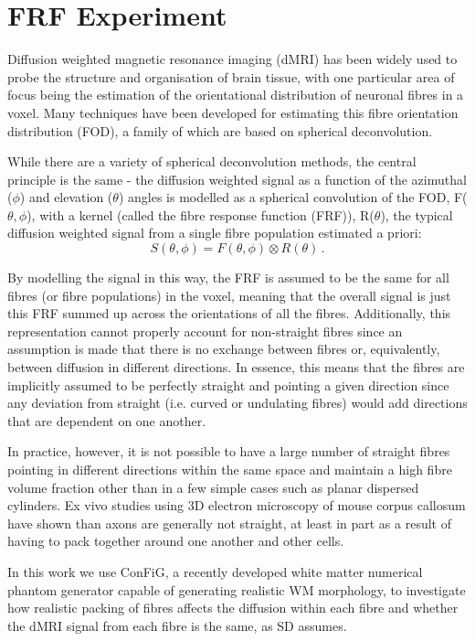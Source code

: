 \chapter{FRF Experiment}
\label{sec:frf-experiment}

Diffusion weighted magnetic resonance imaging (dMRI) has been widely used to probe the structure and organisation of brain tissue, with one particular area of focus being the estimation of the orientational distribution of neuronal fibres in a voxel. Many techniques have been developed for estimating this fibre orientation distribution (FOD), a family of which are based on spherical deconvolution.

While there are a variety of spherical deconvolution methods, the central principle is the same - the diffusion weighted signal as a function of the azimuthal ($\phi$) and elevation ($\theta$) angles is modelled as a spherical convolution of the FOD, F($\theta,\phi$), with a kernel (called the fibre response function (FRF)), R($\theta$), the typical diffusion weighted signal from a single fibre population estimated a priori:
\begin{equation}
  S(\theta, \phi) = F(\theta, \phi) \otimes R(\theta) \,.
  \label{eq:spherical_conv}
\end{equation}

By modelling the signal in this way, the FRF is assumed to be the same for all fibres (or fibre populations) in the voxel, meaning that the overall signal is just this FRF summed up across the orientations of all the fibres.
Additionally, this representation cannot properly account for non-straight fibres since an assumption is made that there is no exchange between fibres or, equivalently, between diffusion in different directions.
In essence, this means that the fibres are implicitly assumed to be perfectly straight and pointing a given direction since any deviation from straight (i.e. curved or undulating fibres) would add directions that are dependent on one another.

In practice, however, it is not possible to have a large number of straight fibres pointing in different directions within the same space and maintain a high fibre volume fraction other than in a few simple cases such as planar dispersed cylinders. Ex vivo studies using 3D electron microscopy of mouse corpus callosum have shown than axons are generally not straight, at least in part as a result of having to pack together around one another and other cells.

In this work we use ConFiG, a recently developed white matter numerical phantom generator capable of generating realistic WM morphology, to investigate how realistic packing of fibres affects the diffusion within each fibre and whether the dMRI signal from each fibre is the same, as SD assumes.


